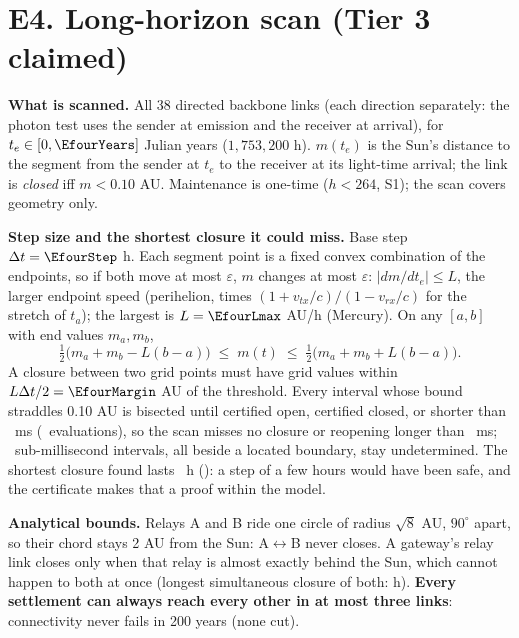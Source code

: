 \section*{E4. Long-horizon scan (Tier 3 claimed)}

\textbf{What is scanned.} All 38 directed backbone links (each direction separately: the photon test uses the sender at emission and the receiver at arrival), for
$t_e \in [0, \EfourYears]$ Julian years ($1{,}753{,}200$ h). $m(t_e)$ is the Sun's distance to the segment from the sender at $t_e$ to the receiver at its light-time arrival; the link is
\emph{closed} iff $m < 0.10$ AU. Maintenance is one-time ($h<264$, S1); the scan covers geometry only.

\textbf{Step size and the shortest closure it could miss.} Base step $\Delta t = \EfourStep$ h. Each segment point is a fixed convex combination of the endpoints, so if both move at most
$\varepsilon$, $m$ changes at most $\varepsilon$: $|dm/dt_e| \le L$, the larger endpoint speed (perihelion, times $(1+v_{tx}/c)/(1-v_{rx}/c)$ for the stretch of $t_a$); the largest is
$L=\EfourLmax$ AU/h (Mercury). On any $[a,b]$ with end values $m_a, m_b$,
\[ \tfrac12\bigl(m_a+m_b-L(b-a)\bigr) \;\le\; m(t) \;\le\; \tfrac12\bigl(m_a+m_b+L(b-a)\bigr). \]
A closure between two grid points must have grid values within $L\Delta t/2 = \EfourMargin$ AU of the threshold. Every interval whose bound straddles 0.10 AU is bisected until certified
open, certified closed, or shorter than \EfourTolMs\ ms (\EfourEvals\ evaluations), so the scan misses no closure or reopening longer than \EfourTolMs\ ms; \EfourSlivers\ sub-millisecond
intervals, all beside a located boundary, stay undetermined. The shortest closure found lasts \EfourShortestH\ h (\EfourShortestLink): a step of a few hours would have been safe, and the
certificate makes that a proof within the model.

\textbf{Analytical bounds.} Relays A and B ride one circle of radius $\sqrt8$ AU, $90^\circ$ apart, so their chord stays 2 AU from the Sun: A$\leftrightarrow$B never closes. A gateway's relay link closes only when that relay is almost exactly behind the Sun, which cannot happen to both at once (longest simultaneous closure of both: \EfourBothClosedMaxH h). \textbf{Every settlement can always reach every other in at most three links}: connectivity never fails in 200 years (none cut).

\begin{table}[h]\centering
{}
\caption{Closures per settlement link over \EfourYears\ Julian years (worse of the two directions). Open \% is the long-run fraction of emission times at which the link can launch;
d = closure duration in days.}
\end{table}

